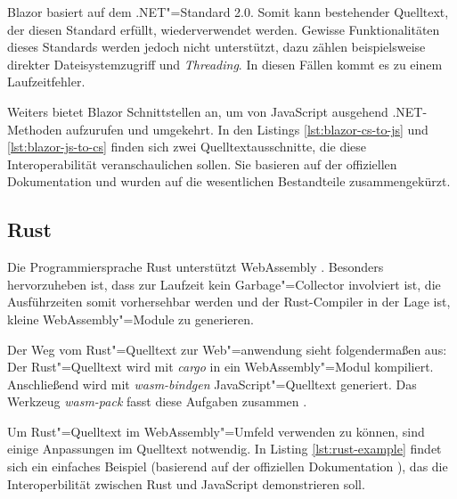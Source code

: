 Blazor basiert auf dem .NET"=Standard 2.0. Somit kann bestehender Quelltext, der diesen Standard erfüllt, wiederverwendet werden. Gewisse Funktionalitäten dieses Standards werden jedoch nicht unterstützt, dazu zählen beispielsweise direkter Dateisystemzugriff und \emph{Threading}. In diesen Fällen kommt es zu einem Laufzeitfehler.

Weiters bietet Blazor Schnittstellen an, um von JavaScript ausgehend .NET-Methoden aufzurufen und umgekehrt. In den Listings \ref{lst:blazor-cs-to-js} und \ref{lst:blazor-js-to-cs} finden sich zwei Quelltextausschnitte, die diese Interoperabilität veranschaulichen sollen. Sie basieren auf der offiziellen Dokumentation und wurden auf die wesentlichen Bestandteile zusammengekürzt.

\pagebreak




\subsection{Rust}

Die Programmiersprache Rust unterstützt WebAssembly \cite{RustWasmWebsite}. Besonders hervorzuheben ist, dass zur Laufzeit kein Garbage"=Collector involviert ist, die Ausführzeiten somit vorhersehbar werden und der Rust-Compiler in der Lage ist, kleine WebAssembly"=Module zu generieren.

Der Weg vom Rust"=Quelltext zur Web"=anwendung sieht folgendermaßen aus: Der Rust"=Quelltext wird mit \emph{cargo} in ein WebAssembly"=Modul kompiliert. Anschließend wird mit \emph{wasm-bindgen} JavaScript"=Quelltext generiert. Das Werkzeug \emph{wasm-pack} fasst diese Aufgaben zusammen \cite{RustWasmBook}.

Um Rust"=Quelltext im WebAssembly"=Umfeld verwenden zu können, sind einige Anpassungen im Quelltext notwendig. In Listing \ref{lst:rust-example} findet sich ein einfaches Beispiel (basierend auf der offiziellen Dokumentation \cite{RustWasmBook}), das die Interoperbilität zwischen Rust und JavaScript demonstrieren soll.



